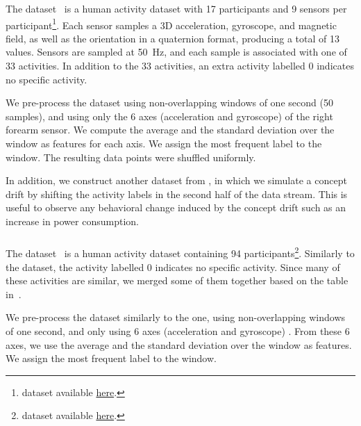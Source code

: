 \subsubsection{\banosdataset}
The \banosdataset dataset~\cite{Banos_2014} is a
human activity dataset with 17 participants
and 9 sensors per
participant\footnote{\banosdataset dataset
available
\href{https://archive.ics.uci.edu/ml/datasets/REALDISP+Activity+Recognition+Dataset\#:\~:text=The\%20REALDISP\%20(REAListic\%20sensor\%20DISPlacement,\%2Dplacement\%20and\%20induced\%2Ddisplacement.}{here}.}. Each sensor samples a 3D
acceleration, gyroscope, and magnetic field, as
well as the orientation in a quaternion format,
producing a total of 13 values.  Sensors are
sampled at 50~Hz, and each sample is associated
with one of 33 activities. In addition to the 33
activities, an extra activity labelled 0 indicates
no specific activity.

We pre-process the \banosdataset dataset using
non-overlapping windows of one second (50
samples), and using only the 6 axes (acceleration
and gyroscope)
of the right forearm sensor. We compute the average and the standard deviation over the
window as features for each axis. We assign the most
frequent label to the window.  The resulting data
points were shuffled uniformly.

In addition, we construct another dataset from \banosdataset, in which we
simulate a concept drift by shifting the activity labels in the
second half of the data stream. This is useful to
observe any behavioral change induced by the
concept drift such as an increase in power
consumption.

\subsubsection{\recofitdataset}
The \recofitdataset dataset~\cite{recofit} is a
human activity dataset containing 94
participants\footnote{\recofitdataset dataset
available
\href{https://msropendata.com/datasets/799c1167-2c8f-44c4-929c-227bf04e2b9a}{here}.}. Similarly to the \banosdataset
dataset, the activity labelled 0 indicates no
specific activity.
Since many of these activities are similar, we
merged some of them together based on the table
in~\cite{behzad2019}. 

We pre-process the dataset similarly to the
\banosdataset one, using non-overlapping windows of
one second, and only using 6 axes (acceleration
and gyroscope)
. From these 6 axes, we use the average and the standard deviation
over the window as features. We assign the most
frequent label to the window.


